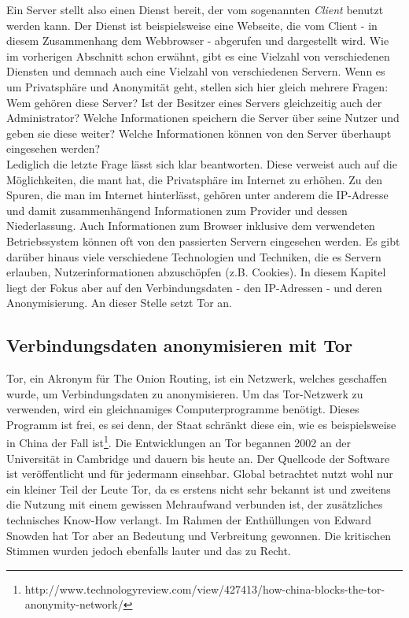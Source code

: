 Ein Server stellt also einen Dienst bereit, der vom sogenannten \textit{Client} benutzt werden kann.
Der Dienst ist beispielsweise eine Webseite, die vom Client - in diesem Zusammenhang dem Webbrowser - abgerufen und dargestellt wird.
Wie im vorherigen Abschnitt schon erwähnt, gibt es eine Vielzahl von verschiedenen Diensten und demnach auch eine Vielzahl von verschiedenen Servern.
Wenn es um Privatsphäre und Anonymität geht, stellen sich hier gleich mehrere Fragen:
Wem gehören diese Server?
Ist der Besitzer eines Servers gleichzeitig auch der Administrator?
Welche Informationen speichern die Server über seine Nutzer und geben sie diese weiter?
Welche Informationen können von den Server überhaupt eingesehen werden?
\\
Lediglich die letzte Frage lässt sich klar beantworten.
Diese verweist auch auf die Möglichkeiten, die mant hat, die Privatsphäre im Internet zu erhöhen.
Zu den Spuren, die man im Internet hinterlässt, gehören unter anderem die IP-Adresse und damit zusammenhängend Informationen zum Provider und dessen Niederlassung.
Auch Informationen zum Browser inklusive dem verwendeten Betriebssystem können oft von den passierten Servern eingesehen werden.
Es gibt darüber hinaus viele verschiedene Technologien und Techniken, die es Servern erlauben, Nutzerinformationen abzuschöpfen (z.B. Cookies).
In diesem Kapitel liegt der Fokus aber auf den Verbindungsdaten - den IP-Adressen - und deren Anonymisierung.
An dieser Stelle setzt Tor an.

\subsection{Verbindungsdaten anonymisieren mit Tor}
Tor, ein Akronym für The Onion Routing, ist ein Netzwerk, welches geschaffen wurde, um Verbindungsdaten zu anonymisieren.
Um das Tor-Netzwerk zu verwenden, wird ein gleichnamiges Computerprogramme benötigt.
Dieses Programm ist frei, es sei denn, der Staat schränkt diese ein, wie es beispielsweise in China der Fall ist\footnote{http://www.technologyreview.com/view/427413/how-china-blocks-the-tor-anonymity-network/}.
Die Entwicklungen an Tor begannen 2002 an der Universität in Cambridge und dauern bis heute an. Der Quellcode der Software ist veröffentlicht und für jedermann einsehbar.
Global betrachtet nutzt wohl nur ein kleiner Teil der Leute Tor, da es erstens nicht sehr bekannt ist und zweitens die Nutzung mit einem gewissen Mehraufwand verbunden ist, der zusätzliches technisches Know-How verlangt. Im Rahmen der Enthüllungen von Edward Snowden hat Tor aber an Bedeutung und Verbreitung gewonnen. Die kritischen Stimmen wurden jedoch ebenfalls lauter und das zu Recht.

